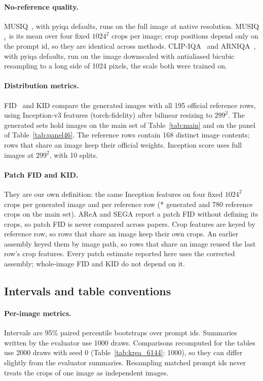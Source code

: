 \paragraph{No-reference quality.} MUSIQ~\citep{ke2021musiq}, with pyiqa defaults, runs on the full image at native resolution. MUSIQ$_\text{c}$ is its mean over four fixed $1024^2$ crops per image; crop positions depend only on the prompt id, so they are identical across methods. CLIP-IQA~\citep{wang2022clipiqa} and ARNIQA~\citep{agnolucci2024arniqa}, with pyiqa defaults, run on the image downscaled with antialiased bicubic resampling to a long side of 1024 pixels, the scale both were trained on.

\paragraph{Distribution metrics.} FID~\citep{heusel2017fid} and KID compare the generated images with all 195 official reference rows, using Inception-v3 features (torch-fidelity) after bilinear resizing to $299^2$. The generated sets hold \nmain{} images on the main set of Table~\ref{tab:main} and \npanel{} on the panel of Table~\ref{tab:panel46}. The reference rows contain 168 distinct image contents; rows that share an image keep their official weights. Inception score uses full images at $299^2$, with 10 splits.

\paragraph{Patch FID and KID.} They are our own definition: the same Inception features on four fixed $1024^2$ crops per generated image and per reference row (\the{}*\nmain\relax{} generated and 780 reference crops on the main set). AReA and SEGA report a patch FID without defining its crops, so patch FID is never compared across papers. Crop features are keyed by reference row, so rows that share an image keep their own crops. An earlier assembly keyed them by image path, so rows that share an image reused the last row's crop features. Every patch estimate reported here uses the corrected assembly; whole-image FID and KID do not depend on it.

\subsection{Intervals and table conventions}
\label{app:intervals}

\paragraph{Per-image metrics.} Intervals are 95\% paired percentile bootstraps over prompt ids. Summaries written by the evaluator use 1000 draws. Comparisons recomputed for the tables use 2000 draws with seed 0 (Table~\ref{tab:krea_6144}: 1000), so they can differ slightly from the evaluator summaries. Resampling matched prompt ids never treats the crops of one image as independent images.

